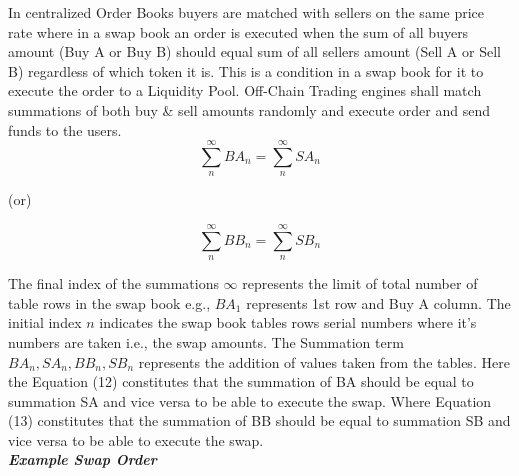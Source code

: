 \documentclass[letterpaper,11pt]{article}
\begin{document}
In centralized Order Books buyers are matched with sellers on the same price rate where in a swap book an order is executed when the sum of all buyers amount (Buy A or Buy B) should equal sum of all sellers amount (Sell A or Sell B) regardless of which token it is. This is a condition in a swap book for it to execute the order to a Liquidity Pool. Off-Chain Trading engines shall match summations of both buy \& sell amounts randomly and execute order and send funds to the users.\\

\[\sum_{n}^{\infty} BA_n = \sum_{n}^{\infty} SA_n\]


\begin{center}
(or)
\end{center}
\[\sum_{n}^{\infty} BB_n = \sum_{n}^{\infty} SB_n\]

The final index of the summations $\infty$ represents the limit of total number of table rows in the swap book e.g., $BA_1$ represents 1st row and Buy A column. The initial index $n$ indicates the swap book tables rows serial numbers where it's numbers are taken i.e., the swap amounts. The Summation term $BA_n, SA_n, BB_n, SB_n$ represents the addition of values taken from the tables. Here the Equation (12) constitutes that the summation of BA should be equal to summation SA and vice versa to be able to execute the swap. Where Equation (13) constitutes that the summation of BB should be equal to summation SB and vice versa to be able to execute the swap.\\

\textit{\textbf{Example Swap Order}}\\
\end{document}
